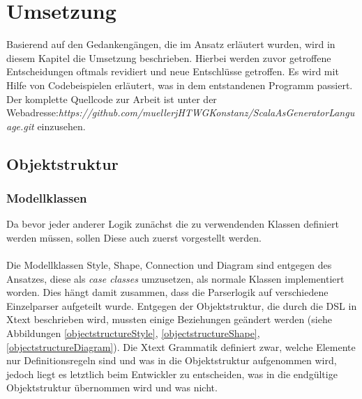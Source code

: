 \chapter{Umsetzung}
Basierend auf den Gedankengängen, die im Ansatz erläutert wurden, wird in diesem Kapitel die Umsetzung beschrieben. Hierbei werden zuvor getroffene Entscheidungen oftmals revidiert und neue Entschlüsse getroffen. Es wird mit Hilfe von Codebeispielen erläutert, was in dem entstandenen Programm passiert. Der komplette Quellcode zur Arbeit ist unter der Webadresse:\linebreak\textit{https://github.com/muellerjHTWGKonstanz/ScalaAsGeneratorLanguage.git} \linebreak einzusehen.
\section{Objektstruktur}
\subsection{Modellklassen}
Da bevor jeder anderer Logik zunächst die zu verwendenden Klassen definiert werden müssen, sollen Diese auch zuerst vorgestellt werden.\\\\Die Modellklassen Style, Shape, Connection und Diagram sind entgegen des Ansatzes, diese als \textit{case classes} umzusetzen, als normale Klassen implementiert worden. Dies hängt damit zusammen, dass die Parserlogik auf verschiedene Einzelparser aufgeteilt wurde.
Entgegen der Objektstruktur, die durch die DSL in Xtext beschrieben wird, mussten einige Beziehungen geändert werden (siehe Abbildungen \ref{objectstructureStyle}, \ref{objectstructureShape}, \ref{objectstructureDiagram}).
Die Xtext Grammatik definiert zwar, welche Elemente nur Definitionsregeln sind und was in die Objektstruktur aufgenommen wird, jedoch liegt es letztlich beim Entwickler zu entscheiden, was in die endgültige Objektstruktur übernommen wird und was nicht.
